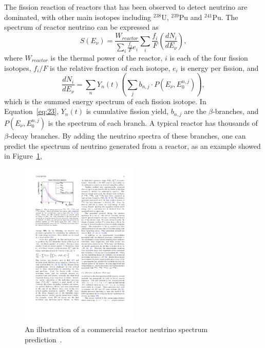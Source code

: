     The fission reaction of reactors that has been observed to detect neutrino are \Ulow dominated, with other main isotopes including $^{238}$U, $^{239}$Pu and $^{241}$Pu.
    The spectrum of reactor neutrino can be expressed as
    \begin{equation}\label{eq2.2}
        S(E_\nu) = \frac{W_{reactor}}{\sum_i \frac{f_i}{F}e_i}\sum_i\frac{f_i}{F}(\frac{dN_i}{dE_\nu}),
    \end{equation}
    where $W_{reactor}$ is the thermal power of the reactor, $i$ is each of the four fission isotopes, $f_i/F$ is the relative fraction of each isotope, $e_i$ is energy per fission, and 
    \begin{equation}
        \frac{dN_i}{dE_\nu} = \sum_n Y_n(t)(\sum_j b_{n,j}\cdot P(E_\nu, E_0^{n,j})),
        \label{eq:23}
    \end{equation}
    which is the summed energy spectrum of each fission isotope.
    In Equation~\ref{eq:23}, $Y_n(t)$ is cumulative fission yield, $b_{n,j}$ are the $\beta$-branches, and $P(E_\nu, E_0^{n,j})$ is the spectrum of each branch.
    A typical reactor has thousands of $\beta$-decay branches. 
    By adding the neutrino spectra of these branches, one can predict the spectrum of neutrino generated from a reactor, as an example showed in Figure~\ref{fig:2.1},
    \begin{figure}[h!]\label{fig:2.1}
    \centering
    \includegraphics[width=0.5\textwidth]{Figures/RxNeutrinoSpec.pdf}
    \caption[Reactor neutrino spectrum]{An illustration of a commercial reactor neutrino spectrum prediction~\cite{bib:Qian2019}.}
    \end{figure}  

